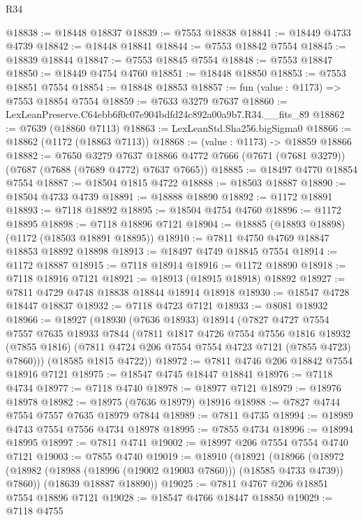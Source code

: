 \begin{lexlean}{R34}
\begin{coremodule}
@18838 := @18448 @18837
@18839 := @7553 @18838
@18841 := @18449 @4733 @4739
@18842 := @18448 @18841
@18844 := @7553 @18842 @7554
@18845 := @18839 @18844
@18847 := @7553 @18845 @7554
@18848 := @7553 @18847
@18850 := @18449 @4754 @4760
@18851 := @18448 @18850
@18853 := @7553 @18851 @7554
@18854 := @18848 @18853
@18857 := fun (value : @1173) => @7553 @18854 @7554
@18859 := @7633 @3279 @7637
@18860 := LexLeanPreserve.C64ebb6f0c07e904bdfd24c892a00a9b7.R34.__fits_89
@18862 := @7639 (@18860 @7113)
@18863 := LexLeanStd.Sha256.bigSigma0
@18866 := @18862 (@1172 (@18863 @7113))
@18868 := (value : @1173) -> @18859 @18866
@18882 := @7650
    @3279
    @7637
    @18866
    @4772
    @7666
    (@7671 (@7681 @3279))
    (@7687 (@7688 (@7689 @4772) @7637 @7665))
@18885 := @18497 @4770 @18854 @7554
@18887 := @18504 @1815 @4722
@18888 := @18503 @18887
@18890 := @18504 @4733 @4739
@18891 := @18888 @18890
@18892 := @1172 @18891
@18893 := @7118 @18892
@18895 := @18504 @4754 @4760
@18896 := @1172 @18895
@18898 := @7118 @18896 @7121
@18904 := @18885 (@18893 @18898) (@1172 (@18503 @18891 @18895))
@18910 := @7811 @4750 @4769 @18847 @18853 @18892 @18898
@18913 := @18497 @4749 @18845 @7554
@18914 := @1172 @18887
@18915 := @7118 @18914
@18916 := @1172 @18890
@18918 := @7118 @18916 @7121
@18921 := @18913 (@18915 @18918) @18892
@18927 := @7811 @4729 @4748 @18838 @18844 @18914 @18918
@18930 := @18547 @4728 @18447 @18837
@18932 := @7118 @4723 @7121
@18933 := @8081 @18932
@18966 := @18927
    (@18930
      (@7636 @18933)
      @18914
      (@7827
        @4727
        @7554
        @7557
        @7635
        @18933
        @7844
        (@7811
          @1817
          @4726
          @7554
          @7556
          @1816
          @18932
          (@7855 @1816)
          (@7811 @4724 @206 @7554 @7554 @4723 @7121 (@7855 @4723) @7860)))
      (@18585 @1815 @4722))
@18972 := @7811 @4746 @206 @18842 @7554 @18916 @7121
@18975 := @18547 @4745 @18447 @18841
@18976 := @7118 @4734
@18977 := @7118 @4740
@18978 := @18977 @7121
@18979 := @18976 @18978
@18982 := @18975 (@7636 @18979) @18916
@18988 := @7827 @4744 @7554 @7557 @7635 @18979 @7844
@18989 := @7811 @4735
@18994 := @18989 @4743 @7554 @7556 @4734 @18978
@18995 := @7855 @4734
@18996 := @18994 @18995
@18997 := @7811 @4741
@19002 := @18997 @206 @7554 @7554 @4740 @7121
@19003 := @7855 @4740
@19019 := @18910
    (@18921
      (@18966 (@18972 (@18982 (@18988 (@18996 (@19002 @19003 @7860))) (@18585 @4733 @4739)) @7860))
      (@18639 @18887 @18890))
@19025 := @7811 @4767 @206 @18851 @7554 @18896 @7121
@19028 := @18547 @4766 @18447 @18850
@19029 := @7118 @4755

\end{coremodule}
\end{lexlean}
